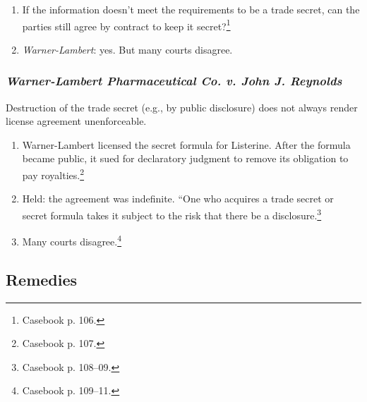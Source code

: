 \begin{enumerate}
    \item If the information doesn't meet the requirements to be a trade 
    secret, can the parties still agree by contract to keep it 
    secret?\footnote{Casebook p. 106.}
    \item \emph{Warner-Lambert}: yes. But many courts disagree.
\end{enumerate}

\subsubsection{\emph{Warner-Lambert Pharmaceutical Co. v. John J. Reynolds}}

Destruction of the trade secret (e.g., by public disclosure) does not always 
render license agreement unenforceable.

\begin{enumerate}
    \item Warner-Lambert licensed the secret formula for Listerine. After the 
    formula became public, it sued for declaratory judgment to remove its 
    obligation to pay royalties.\footnote{Casebook p. 107.}
    \item Held: the agreement was indefinite. ``One who acquires a trade 
    secret or secret formula takes it subject to the risk that there be a 
    disclosure.\footnote{Casebook p. 108--09.}
    \item Many courts disagree.\footnote{Casebook p. 109--11.}
\end{enumerate}

\subsection{Remedies}

